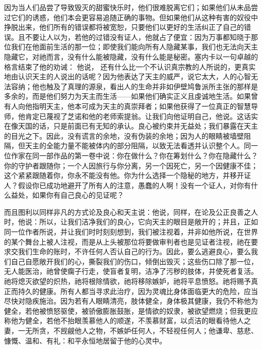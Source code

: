 因为当人们品尝了导致毁灭的甜蜜快乐时，他们很难脱离它们；如果他们从未品尝过它们的诱惑，他们本会更容易追随正确的事物。但如果他们从这种有害的奴役中挣脱出来，他们所有的错误都将被宽恕，只要他们以更好的生活纠正了自己的错误。且不要让人以为，若他的过错没有证人，他就占了便宜：因为万事都知晓于那位我们在他面前生活的那一位；即使我们能向所有人隐藏某事，我们也无法向天主隐藏它，对祂而言，没有什么能被隐藏，没有什么能是秘密。塞内卡以一句卓越的格言结束了他的劝诫： 他说， 还有什么比一个不认识真宗教的人所说的，更真实地由认识天主的人说出的话呢？因为他表达了天主的威严，说它太大，人的心智无法容纳；他也触及了真理的源泉，看出人的生命并非如伊壁鸠鲁派所主张的那样是多余的，而是他们努力为天主而生活——如果他们确实正义且虔诚地生活。如果曾有人向他指明天主，他本可成为天主的真崇拜者；如果他获得了一位真正的智慧导师，他肯定已蔑视了芝诺和他的老师索提翁。让我们向他证明自己，他说。这话实在像天国的话，只是前面已有无知的承认。良心被约束并无益处；我们暴露在天主的目光之下。因此，没有谎言的余地，没有伪装的余地；因为人的眼睛被墙壁阻隔，但天主的全能力量不能被体内的部分阻隔，以致无法看透并认识整个人。同一位作家在同一部作品的第一卷中说：你在做什么？你在筹划什么？你在隐藏什么？你的守护者跟随你；一个人因旅行与你分离，另一个因死亡，另一个因健康不佳；这个紧紧跟随着你，你永不能没有他。你为什么选择一个隐秘的地方，并移开证人？假设你已成功地避开了所有人的注意，愚蠢的人啊！没有一个证人，对你有什么益处，如果你有自己良心的见证呢？\par

而且图利以同样非凡的方式论及良心和天主说：他说，同样，在论及公正良善之人时，他说：所以，让我们洁净我们的良心，它向天主的眼目是敞开的；并且，正如同一位作者所说，并让我们时时刻刻想到，我们被注视着，并非如他所说，在世界的某个舞台上被人注视，而是从上头被那位将要做审判者也是见证者注视，祂在要求交我们生命的账时，不许任何人否认自己的行为。因此，要么逃避良心，要么我们自己自愿敞开我们的心，撕裂我们的伤口，倾倒出毁灭；这些伤口除了那一位，无人能医治，祂曾使瘸子行走，使盲者复明，洁净了污秽的肢体，并使死者复活。祂将熄灭欲望的炽热，祂将根除情欲，祂将移除嫉妒，祂将平息愤怒。祂将赐予真正而持久的健康。所有人都当寻求此治疗，因为灵魂比身体面临更大的危险，应当尽快对隐疾施治。因为若有人眼睛清亮，肢体健全，身体极其健康，我仍不称他为健全，若他被愤怒驱使，被骄傲膨胀鼓胀，是情欲的奴隶，被欲望燃烧；但我更应称他为健全，若他不抬眼羡慕他人的顺遂，不羡慕财富，以贞洁的眼看待他人之妻，一无所贪，不觊觎他人之物，不嫉妒任何人，不轻视任何人；他谦卑、慈悲、慷慨、温和、有礼：和平永恒地居留于他的心灵中。\par

